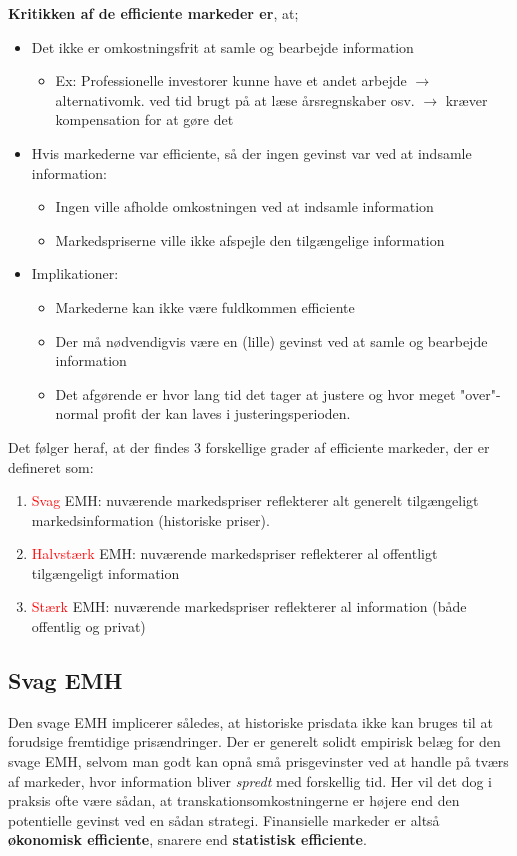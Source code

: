 \documentclass[10pt,reqno, usenames]{article}
\begin{document}
\textbf{Kritikken af de efficiente markeder er}, at; 
\begin{itemize}
    \item Det ikke er omkostningsfrit at samle og bearbejde information
    \begin{itemize}
        \item Ex: Professionelle investorer kunne have et andet arbejde $\rightarrow$ alternativomk. ved tid brugt på at læse årsregnskaber osv. $\rightarrow$ kræver kompensation for at gøre det
    \end{itemize}
    \item Hvis markederne var efficiente, så der ingen gevinst var ved at indsamle information:
    \begin{itemize}
        \item Ingen ville afholde omkostningen ved at indsamle information
        \item Markedspriserne ville ikke afspejle den tilgængelige information
    \end{itemize}
    \item Implikationer:
    \begin{itemize}
        \item Markederne kan ikke være fuldkommen efficiente
        \item Der må nødvendigvis være en (lille) gevinst ved at samle og bearbejde information
        \item Det afgørende er hvor lang tid det tager at justere og hvor meget "over"-normal profit der kan laves i justeringsperioden.
    \end{itemize}
\end{itemize}

Det følger heraf, at der findes 3 forskellige grader af efficiente markeder, der er defineret som: 

\begin{enumerate}
    \item \textcolor{red}{Svag} EMH: nuværende markedspriser reflekterer alt generelt tilgængeligt markedsinformation (historiske priser).
    \item \textcolor{red}{Halvstærk} EMH: nuværende markedspriser reflekterer al offentligt tilgængeligt information
    \item \textcolor{red}{Stærk} EMH: nuværende markedspriser reflekterer al information (både offentlig og privat)
\end{enumerate}

\subsection{Svag EMH}
Den svage EMH implicerer således, at historiske prisdata ikke kan bruges til at forudsige fremtidige prisændringer. Der er generelt solidt empirisk belæg for den svage EMH, selvom man godt kan opnå små prisgevinster ved at handle på tværs af markeder, hvor information bliver \textit{spredt} med forskellig tid. Her vil det dog i praksis ofte være sådan, at transkationsomkostningerne er højere end den potentielle gevinst ved en sådan strategi. Finansielle markeder er altså \textbf{økonomisk efficiente}, snarere end \textbf{statistisk efficiente}.
\end{document}
